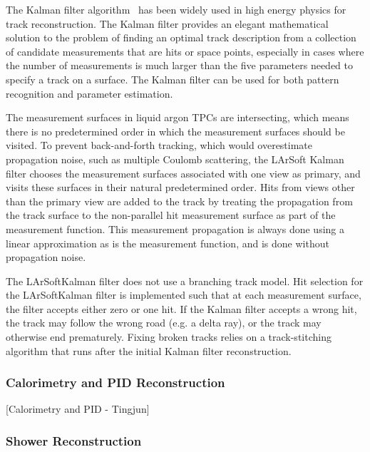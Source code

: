 \documentclass[12pt]{elsarticle}
\newcommand{\larsoft}{LArSoft}
\begin{document}
The Kalman filter algorithm~\cite{kalman} has been widely used in high
energy physics for track reconstruction. The Kalman
filter provides an elegant mathematical solution to the problem of
finding an optimal track description from a collection of candidate
measurements that are hits or space points, especially in cases where the
number of measurements is much larger than the five parameters
needed to specify a track on a surface.  The Kalman
filter can be used for both pattern recognition and parameter
estimation.  

The measurement surfaces in liquid argon TPCs are intersecting, which means there is no
predetermined order in which the measurement surfaces should be
visited.  To prevent back-and-forth tracking, which would overestimate
propagation noise, such as multiple Coulomb scattering, the \larsoft
Kalman filter chooses the measurement surfaces associated with one
view as primary, and visits these surfaces in their natural
predetermined order.  Hits from views other than the primary view are
added to the track by treating the propagation from the track surface
to the non-parallel hit measurement surface as part of the measurement
function.  This measurement propagation is always done using a linear
approximation as is the measurement function, and is done without
propagation noise.

The \larsoft Kalman filter
does not use a branching track model. Hit selection for the \larsoft Kalman filter is
implemented such that at each measurement surface, the filter accepts
either zero or one hit. If the Kalman filter accepts a wrong hit, the
track may follow the wrong road (e.g. a delta ray), or the track may
otherwise end prematurely.  Fixing broken tracks relies on
a track-stitching algorithm that runs after the initial Kalman
filter reconstruction.

\subsubsection{Calorimetry and PID Reconstruction}
[Calorimetry and PID - Tingjun]

\subsubsection{Shower Reconstruction}
\end{document}
